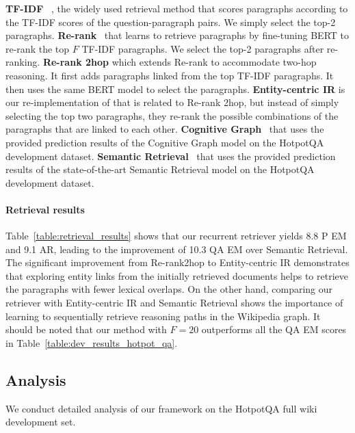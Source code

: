 {\bf TF-IDF} ~\citep{chen2017reading}, the widely used retrieval method that scores paragraphs according to the TF-IDF scores of the question-paragraph pairs.
We simply select the top-2 paragraphs.
\newline
{\bf Re-rank}~\citep{nogueira2019passage} that learns to retrieve paragraphs by fine-tuning BERT to re-rank the top $F$ TF-IDF paragraphs.
We select the top-2 paragraphs after re-ranking.
\newline
{\bf  Re-rank 2hop} which extends Re-rank to accommodate two-hop reasoning.
It first adds paragraphs linked from the top TF-IDF paragraphs.
It then uses the same BERT model to select the paragraphs.
\newline
{\bf Entity-centric IR} is our re-implementation of \cite{godbole2019entity_links} that is related to Re-rank 2hop, but instead of simply selecting the top two paragraphs, they re-rank the possible combinations of the paragraphs that are linked to each other.
\newline
{\bf Cognitive Graph}~\citep{cognitive_graph_2019} that uses the provided prediction results of the Cognitive Graph model on the HotpotQA development dataset.\newline
{\bf Semantic Retrieval}~\citep{nie_pip_2019} that uses the provided prediction results of the state-of-the-art Semantic Retrieval model on the HotpotQA development dataset.

\vspace{-2mm} \paragraph{Retrieval results}
Table~\ref{table:retrieval_results} shows that our recurrent retriever yields 8.8 P EM and 9.1 AR, leading to the improvement of 10.3 QA EM over Semantic Retrieval.
The significant improvement from Re-rank2hop to Entity-centric IR demonstrates that exploring entity links from the initially retrieved documents helps to retrieve the paragraphs with fewer lexical overlaps.
On the other hand, comparing our retriever with Entity-centric IR and Semantic Retrieval shows the importance of learning to sequentially retrieve reasoning paths in the Wikipedia graph. 
It should be noted that our method with $F=20$ outperforms all the QA EM scores in Table~\ref{table:dev_results_hotpot_qa}.

\subsection{Analysis}
We conduct detailed analysis of our framework on the HotpotQA full wiki development set.
\label{sec:analysis}

